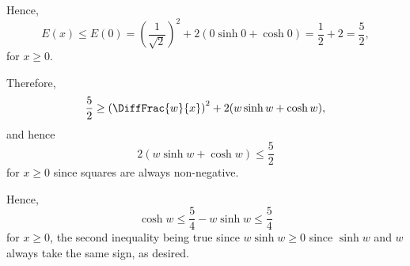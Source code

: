 \begin{enumerate}
          Hence,
          \[
              E(x) \leq E(0) = \left(\frac{1}{\sqrt{2}}\right)^2 + 2 (0 \sinh 0 + \cosh 0) = \frac{1}{2} + 2 = \frac{5}{2},
          \]
          for \(x \geq 0\).

          Therefore,
          \[
              \frac{5}{2} \geq \left(\DiffFrac{w}{x}\right)^2 + 2(w \sinh w + \cosh w),
          \]
          and hence
          \[
              2(w \sinh w + \cosh w) \leq \frac{5}{2}
          \]
          for \(x \geq 0\) since squares are always non-negative.

          Hence,
          \[
              \cosh w \leq \frac{5}{4} - w \sinh w \leq \frac{5}{4}
          \]
          for \(x \geq 0\), the second inequality being true since \(w \sinh w \geq 0\) since \(\sinh w\) and \(w\) always take the same sign, as desired.
\end{enumerate}